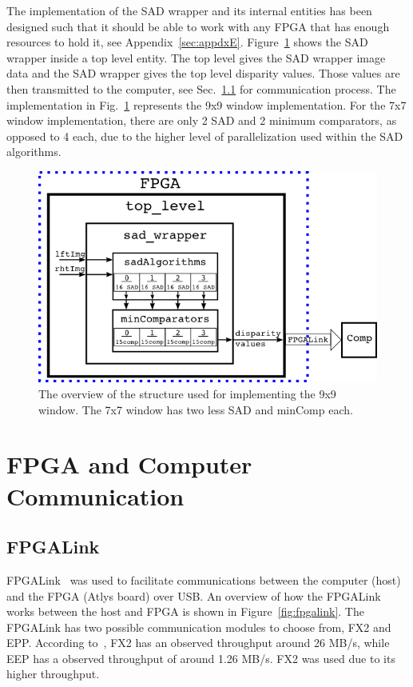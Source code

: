 The implementation of the SAD wrapper and its internal entities has been designed such that it should be able to work with any FPGA that has enough resources to hold it, see Appendix~\ref{sec:appdxE}. Figure~\ref{fig:topLevel_rtl} shows the SAD wrapper inside a top level entity. The top level gives the SAD wrapper image data and the SAD wrapper gives the top level disparity values. Those values are then transmitted to the computer, see Sec.~\ref{sec:fpgalink} for communication process. The implementation in Fig.~\ref{fig:topLevel_rtl} represents the 9x9 window implementation. For the 7x7 window implementation, there are only 2 SAD and 2 minimum comparators, as opposed to 4 each, due to the higher level of parallelization used within the SAD algorithms.

\begin{figure}[h]
	\begin{center}
		\includegraphics[width=150mm]{figures/top_level_rtl.png}
		\captionfonts
		\caption{The overview of the structure used for implementing the 9x9 window. The 7x7 window has two less SAD and minComp each.}
		\label{fig:topLevel_rtl}
	\end{center}
\end{figure}

\section{FPGA and Computer Communication}

\subsection{FPGALink}
\label{sec:fpgalink}

FPGALink~\cite{fpgalink} was used to facilitate communications between the computer (host) and the FPGA (Atlys board) over USB. An overview of how the FPGALink works between the host and FPGA is shown in Figure~\ref{fig:fpgalink}. The FPGALink has two possible communication modules to choose from, FX2 and EPP. According to~\cite{fpgalink}, FX2 has an observed throughput around 26 MB/s, while EEP has a observed throughput of around 1.26 MB/s. FX2 was used due to its higher throughput.

